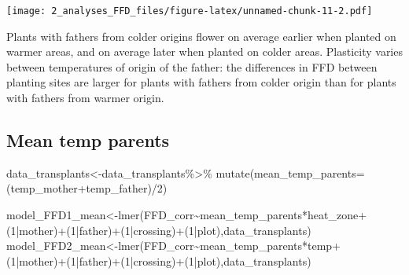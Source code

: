 \documentclass[
]{article}
\newenvironment{Shaded}{\begin{snugshade}}{\end{snugshade}}
\newcommand{\AttributeTok}[1]{\textcolor[rgb]{0.77,0.63,0.00}{#1}}
\newcommand{\DecValTok}[1]{\textcolor[rgb]{0.00,0.00,0.81}{#1}}
\newcommand{\FunctionTok}[1]{\textcolor[rgb]{0.00,0.00,0.00}{#1}}
\newcommand{\NormalTok}[1]{#1}
\newcommand{\OtherTok}[1]{\textcolor[rgb]{0.56,0.35,0.01}{#1}}
\newcommand{\SpecialCharTok}[1]{\textcolor[rgb]{0.00,0.00,0.00}{#1}}
\begin{document}
\texttt{[image: 2\_analyses\_FFD\_files/figure-latex/unnamed-chunk-11-2.pdf]}

Plants with fathers from colder origins flower on average earlier when
planted on warmer areas, and on average later when planted on colder
areas. Plasticity varies between temperatures of origin of the father:
the differences in FFD between planting sites are larger for plants with
fathers from colder origin than for plants with fathers from warmer
origin.

\hypertarget{mean-temp-parents}{%
\subsection{Mean temp parents}\label{mean-temp-parents}}

\begin{Shaded}
\begin{Highlighting}[]
\NormalTok{data\_transplants}\OtherTok{\textless{}{-}}\NormalTok{data\_transplants}\SpecialCharTok{\%\textgreater{}\%}
  \FunctionTok{mutate}\NormalTok{(}\AttributeTok{mean\_temp\_parents=}\NormalTok{(temp\_mother}\SpecialCharTok{+}\NormalTok{temp\_father)}\SpecialCharTok{/}\DecValTok{2}\NormalTok{)}
\end{Highlighting}
\end{Shaded}

\begin{Shaded}
\begin{Highlighting}[]
\NormalTok{model\_FFD1\_mean}\OtherTok{\textless{}{-}}\FunctionTok{lmer}\NormalTok{(FFD\_corr}\SpecialCharTok{\textasciitilde{}}\NormalTok{mean\_temp\_parents}\SpecialCharTok{*}\NormalTok{heat\_zone}\SpecialCharTok{+}
\NormalTok{                   (}\DecValTok{1}\SpecialCharTok{|}\NormalTok{mother)}\SpecialCharTok{+}\NormalTok{(}\DecValTok{1}\SpecialCharTok{|}\NormalTok{father)}\SpecialCharTok{+}\NormalTok{(}\DecValTok{1}\SpecialCharTok{|}\NormalTok{crossing)}\SpecialCharTok{+}\NormalTok{(}\DecValTok{1}\SpecialCharTok{|}\NormalTok{plot),data\_transplants)}
\NormalTok{model\_FFD2\_mean}\OtherTok{\textless{}{-}}\FunctionTok{lmer}\NormalTok{(FFD\_corr}\SpecialCharTok{\textasciitilde{}}\NormalTok{mean\_temp\_parents}\SpecialCharTok{*}\NormalTok{temp}\SpecialCharTok{+}
\NormalTok{                   (}\DecValTok{1}\SpecialCharTok{|}\NormalTok{mother)}\SpecialCharTok{+}\NormalTok{(}\DecValTok{1}\SpecialCharTok{|}\NormalTok{father)}\SpecialCharTok{+}\NormalTok{(}\DecValTok{1}\SpecialCharTok{|}\NormalTok{crossing)}\SpecialCharTok{+}\NormalTok{(}\DecValTok{1}\SpecialCharTok{|}\NormalTok{plot),data\_transplants)}
\end{Highlighting}
\end{Shaded}
\end{document}
